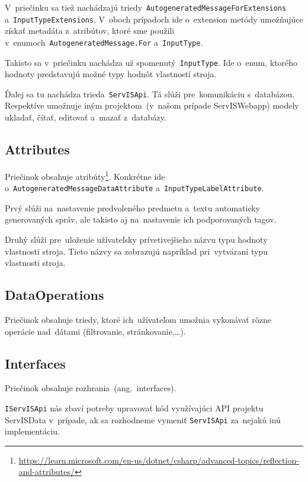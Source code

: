 V~priečinku sa tiež nachádzajú triedy~\verb|AutogeneratedMessageForExtensions| a~\verb|InputTypeExtensions|. V~oboch prípadoch ide o~extension metódy umožňujúce získať metadáta z~atribútov, ktoré sme použili\\v~enumoch~\verb|AutogeneratedMessage.For| a~\verb|InputType|.

Takisto sa v~priečinku nachádza už spomenutý~\verb|InputType|. Ide o~enum, ktorého hodnoty predstavujú možné typy hodnôt vlastností stroja.

Ďalej sa tu nachádza trieda~\verb|ServISApi|. Tá slúži pre~komunikáciu s~databázou. Respektíve umožnuje iným projektom~(v~našom prípade ServISWebapp) modely ukladať, čítať, editovať a~mazať z~databázy.

\subsection{Attributes}

Priečinok obsahuje atribúty\footnote{\url{https://learn.microsoft.com/en-us/dotnet/csharp/advanced-topics/reflection-and-attributes/}}. Konkrétne ide\\o~\verb|AutogeneratedMessageDataAttribute| a~\verb|InputTypeLabelAttribute|.

Prvý slúži na~nastavenie predvoleného predmetu a~textu automaticky generovaných správ, ale takisto aj na~nastavenie ich podporovaných tagov.

Druhý slúži pre~uloženie užívateľsky prívetivejšieho názvu typu hodnoty vlastnosti stroja. Tieto názvy sa zobrazujú napríklad pri~vytváraní typu vlastnosti stroja.

\subsection{DataOperations}
\label{dataoperations}

Priečinok obsahuje triedy, ktoré ich~užívateľom umožnia vykonávať rôzne operácie nad~dátami (filtrovanie, stránkovanie,\dots).

\subsection{Interfaces}

Priečinok obsahuje rozhrania~(ang.~interfaces).

\verb|IServISApi| nás zbaví potreby upravovať kód využívajúci API projektu ServISData v~prípade, ak sa rozhodneme vymeniť \verb|ServISApi| za~nejakú inú implementáciu.

